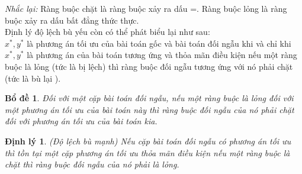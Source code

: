 \documentclass[12pt,a4paper]{report}
\newtheorem{dl}{Định lý}
\newtheorem{bd}{Bổ đề}
\begin{document}
    \textit{Nhắc lại:} Ràng buộc chặt là ràng buộc xảy ra dấu =. Ràng buộc lỏng là ràng buộc xảy ra dấu bất đẳng thức thực.\\
    Định lý độ lệch bù yếu còn có thể phát biểu lại như sau:\\
    $x^*,y^*$ là phương án tối ưu của bài toán gốc và bài toán đối ngẫu khi và chỉ khi $x^*,y^*$ là phương án của bài toán tương ứng và thỏa mãn điều kiện nếu một ràng buộc là lỏng (tức là bị lệch) thì ràng buộc đối ngẫu tương ứng với nó phải chặt (tức là bù lại ).\\
    \begin{bd}
        Đối với một cặp bài toán đối ngẫu, nếu một ràng buộc là lỏng đối với một phương án tối ưu của bài toán này thì ràng buộc đối ngẫu của nó phải chặt đối với phương án tối ưu của bài toán kia.\\
    \end{bd}
     \begin{dl}
        (Độ lệch bù mạnh) Nếu cặp bài toán đối ngẫu có phương án tối ưu thì tồn tại một cặp phương án tối ưu thỏa mãn điều kiện nếu một ràng buộc là chặt thì ràng buộc đối ngẫu của nó phải là lỏng.\\
        
    \end{dl}
\end{document}
